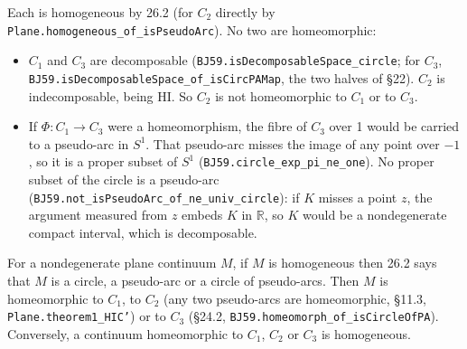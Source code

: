 \documentclass[11pt]{article}
\newcommand{\lean}[1]{\texttt{#1}}
\begin{document}
Each is homogeneous by 26.2 (for $C_2$ directly by \lean{Plane.\hspace{0pt}homogeneous\_\hspace{0pt}of\_\hspace{0pt}isPseudoArc}). No two are homeomorphic:

\begin{itemize}
  \item $C_1$ and $C_3$ are decomposable (\lean{BJ59.\hspace{0pt}isDecomposableSpace\_\hspace{0pt}circle}; for $C_3$, \lean{BJ59.\hspace{0pt}isDecomposableSpace\_\hspace{0pt}of\_\hspace{0pt}isCircPAMap}, the two halves of \S{}22). $C_2$ is indecomposable, being HI. So $C_2$ is not homeomorphic to $C_1$ or to $C_3$.
  \item If $\Phi : C_1 \to C_3$ were a homeomorphism, the fibre of $C_3$ over 1 would be carried to a pseudo-arc in $S^1$. That pseudo-arc misses the image of any point over $-1$, so it is a proper subset of $S^1$ (\lean{BJ59.\hspace{0pt}circle\_\hspace{0pt}exp\_\hspace{0pt}pi\_\hspace{0pt}ne\_\hspace{0pt}one}). No proper subset of the circle is a pseudo-arc (\lean{BJ59.\hspace{0pt}not\_\hspace{0pt}isPseudoArc\_\hspace{0pt}of\_\hspace{0pt}ne\_\hspace{0pt}univ\_\hspace{0pt}circle}): if $K$ misses a point $z$, the argument measured from $z$ embeds $K$ in $\mathbb{R}$, so $K$ would be a nondegenerate compact interval, which is decomposable.
\end{itemize}

For a nondegenerate plane continuum $M$, if $M$ is homogeneous then 26.2 says that $M$ is a circle, a pseudo-arc or a circle of pseudo-arcs. Then $M$ is homeomorphic to $C_1$, to $C_2$ (any two pseudo-arcs are homeomorphic, \S{}11.3, \lean{Plane.\hspace{0pt}theorem1\_\hspace{0pt}HIC'}) or to $C_3$ (\S{}24.2, \lean{BJ59.\hspace{0pt}homeomorph\_\hspace{0pt}of\_\hspace{0pt}isCircleOfPA}). Conversely, a continuum homeomorphic to $C_1$, $C_2$ or $C_3$ is homogeneous.
\end{document}
